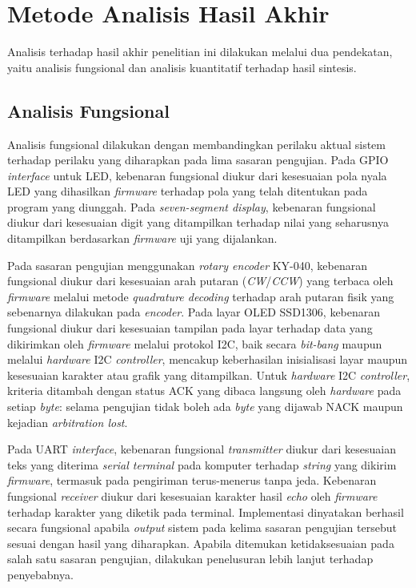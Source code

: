 \section{Metode Analisis Hasil Akhir}
\label{sec:metode-analisis-hasil-akhir}

Analisis terhadap hasil akhir penelitian ini dilakukan melalui dua pendekatan, yaitu analisis fungsional dan analisis kuantitatif terhadap hasil sintesis.

\subsection{Analisis Fungsional}
\label{subsec:analisis-fungsional}

Analisis fungsional dilakukan dengan membandingkan perilaku aktual sistem terhadap perilaku yang diharapkan pada lima sasaran pengujian. Pada GPIO \textit{interface} untuk LED, kebenaran fungsional diukur dari kesesuaian pola nyala LED yang dihasilkan \textit{firmware} terhadap pola yang telah ditentukan pada program yang diunggah. Pada \textit{seven-segment display}, kebenaran fungsional diukur dari kesesuaian digit yang ditampilkan terhadap nilai yang seharusnya ditampilkan berdasarkan \textit{firmware} uji yang dijalankan.

Pada sasaran pengujian menggunakan \textit{rotary encoder} KY-040, kebenaran fungsional diukur dari kesesuaian arah putaran (\textit{CW}/\textit{CCW}) yang terbaca oleh \textit{firmware} melalui metode \textit{quadrature decoding} terhadap arah putaran fisik yang sebenarnya dilakukan pada \textit{encoder}. Pada layar OLED SSD1306, kebenaran fungsional diukur dari kesesuaian tampilan pada layar terhadap data yang dikirimkan oleh \textit{firmware} melalui protokol I2C, baik secara \textit{bit-bang} maupun melalui \textit{hardware} I2C \textit{controller}, mencakup keberhasilan inisialisasi layar maupun kesesuaian karakter atau grafik yang ditampilkan. Untuk \textit{hardware} I2C \textit{controller}, kriteria ditambah dengan status ACK yang dibaca langsung oleh \textit{hardware} pada setiap \textit{byte}: selama pengujian tidak boleh ada \textit{byte} yang dijawab NACK maupun kejadian \textit{arbitration lost}.

Pada UART \textit{interface}, kebenaran fungsional \textit{transmitter} diukur dari kesesuaian teks yang diterima \textit{serial terminal} pada komputer terhadap \textit{string} yang dikirim \textit{firmware}, termasuk pada pengiriman terus-menerus tanpa jeda. Kebenaran fungsional \textit{receiver} diukur dari kesesuaian karakter hasil \textit{echo} oleh \textit{firmware} terhadap karakter yang diketik pada terminal. Implementasi dinyatakan berhasil secara fungsional apabila \textit{output} sistem pada kelima sasaran pengujian tersebut sesuai dengan hasil yang diharapkan. Apabila ditemukan ketidaksesuaian pada salah satu sasaran pengujian, dilakukan penelusuran lebih lanjut terhadap penyebabnya.


